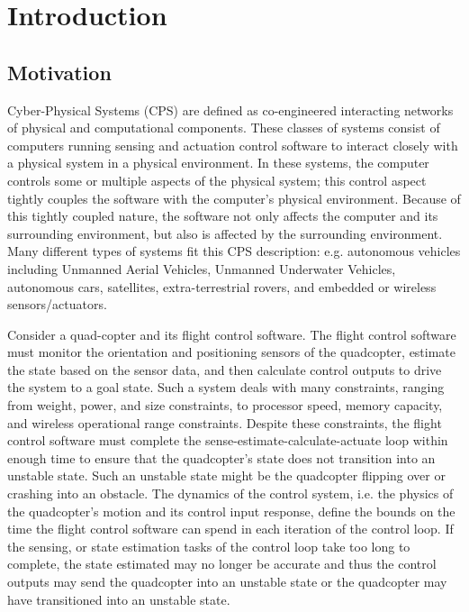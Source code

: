 \chapter{Introduction}
\label{ch:intro}

\section{Motivation}
\label{sec:motivation}

Cyber-Physical Systems (CPS) are defined as co-engineered interacting
networks of physical and computational components.  These classes of
systems consist of computers running sensing and actuation control
software to interact closely with a physical system in a physical
environment.  In these systems, the computer controls some or multiple
aspects of the physical system; this control aspect tightly couples
the software with the computer's physical environment.  Because of
this tightly coupled nature, the software not only affects the
computer and its surrounding environment, but also is affected by the
surrounding environment.  Many different types of systems fit this CPS
description: e.g. autonomous vehicles including Unmanned Aerial
Vehicles, Unmanned Underwater Vehicles, autonomous cars, satellites,
extra-terrestrial rovers, and embedded or wireless sensors/actuators.

Consider a quad-copter and its flight control software.  The flight
control software must monitor the orientation and positioning sensors
of the quadcopter, estimate the state based on the sensor data, and
then calculate control outputs to drive the system to a goal state.
Such a system deals with many constraints, ranging from weight, power,
and size constraints, to processor speed, memory capacity, and
wireless operational range constraints.  Despite these constraints,
the flight control software must complete the
sense-estimate-calculate-actuate loop within enough time to ensure
that the quadcopter's state does not transition into an unstable
state.  Such an unstable state might be the quadcopter flipping over
or crashing into an obstacle.  The dynamics of the control system,
i.e. the physics of the quadcopter's motion and its control input
response, define the bounds on the time the flight control software
can spend in each iteration of the control loop.  If the sensing, or
state estimation tasks of the control loop take too long to complete,
the state estimated may no longer be accurate and thus the control
outputs may send the quadcopter into an unstable state or the
quadcopter may have transitioned into an unstable state.

